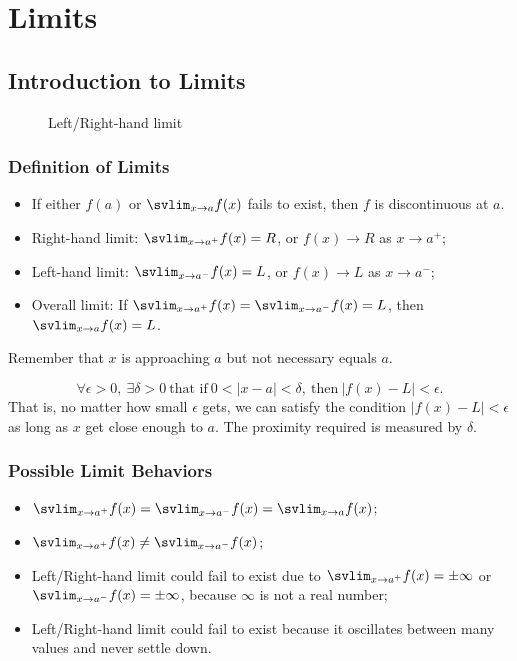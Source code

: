 \chapter{Limits}
\section{Introduction to Limits}
\begin{figure}[H]
  \centering
  \caption{Left/Right-hand limit}
\end{figure}

\subsection{Definition of Limits}
\begin{itemize}
\item If either $f(a)$ or $\svlim_{x\to a} f(x)$ fails to exist, then $f$ is discontinuous at $a$.
\item Right-hand limit: $\svlim_{x\to a^+}f(x)=R$, or $f(x)\to R$ as $x\to a^+$;
\item Left-hand limit: $\svlim_{x\to a^-}f(x)=L$, or $f(x)\to L$ as $x\to a^-$;
\item Overall limit: If $\svlim_{x\to a^+}f(x)=\svlim_{x\to a^-}f(x)=L$, then $\svlim_{x\to a}f(x)=L$.
\end{itemize}

\begin{note}Remember that $x$ is approaching $a$ but not necessary equals $a$.\end{note}
\begin{definition}
\[
\forall\epsilon>0,\ \exists\delta>0\ \text{that if}\ 0<\lvert x-a\rvert<\delta,\ \text{then}\ \lvert f(x)-L\rvert<\epsilon.
\]
That is, no matter how small $\epsilon$ gets, we can satisfy the condition $\lvert f(x)-L\rvert<\epsilon$ as long as $x$ get close enough to $a$. The proximity required is measured by $\delta$.
\end{definition}

\subsection{Possible Limit Behaviors}
\begin{itemize}
\item $\svlim_{x\to a^+}f(x)=\svlim_{x\to a^-}f(x)=\svlim_{x\to a}f(x)$;
\item $\svlim_{x\to a^+}f(x)\neq\svlim_{x\to a^-}f(x)$;
\item Left\slash Right-hand limit could fail to exist due to $\svlim_{x\to a^+}f(x)=\pm\infty$ or $\svlim_{x\to a^-}f(x)=\pm\infty$, because $\infty$ is not a real number;
\item Left\slash Right-hand limit could fail to exist because it oscillates between many values and never settle down.
\end{itemize}

